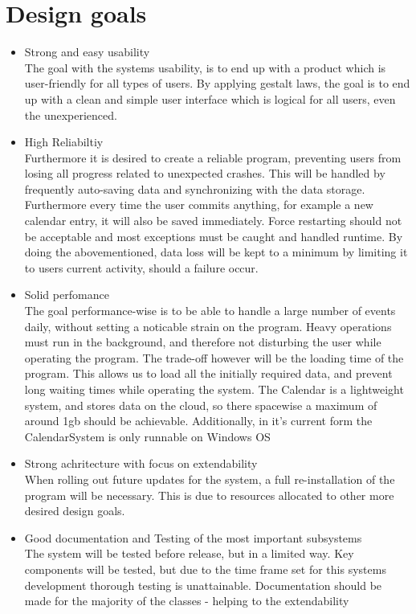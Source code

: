 \section{Design goals}
\begin{itemize}
\item Strong and easy usability\\
The goal with the systems usability, is to end up with a product which is user-friendly for all types of users. By applying gestalt laws, the goal is to end up with a clean and simple user interface which is logical for all users, even the unexperienced.\\
\item High Reliabiltiy\\
Furthermore it is desired to create a reliable program, preventing users from losing all progress related to unexpected crashes. This will be handled by frequently auto-saving data and synchronizing with the data storage. Furthermore every time the user commits anything, for example a new calendar entry, it will also be saved immediately. Force restarting should not be acceptable and most exceptions must be caught and handled runtime. By doing the abovementioned, data loss will be kept to a minimum by limiting it to users current activity, should a failure occur.\\
\item Solid perfomance\\
The goal performance-wise is to be able to handle a large number of events daily, without setting a noticable strain on the program. Heavy operations must run in the background, and therefore not disturbing the user while operating the program. The trade-off however will be the loading time of the program. This allows us to load all the initially required data, and prevent long waiting times while operating the system. The Calendar is a lightweight system, and stores data on the cloud, so there spacewise a maximum of around 1gb should be achievable. Additionally, in it's current form the CalendarSystem is only runnable on Windows OS\\
\item Strong achritecture with focus on extendability\\
When rolling out future updates for the system, a full re-installation of the program will be necessary. This is due to resources allocated to other more desired design goals.\\
\item Good documentation and Testing of the most important subsystems\\
The system will be tested before release, but in a limited way. Key components will be tested, but due to the time frame set for this systems development thorough testing is unattainable. Documentation should be made for the majority of the classes - helping to the extendability \\
\end{itemize}